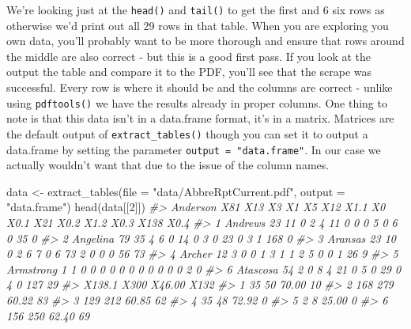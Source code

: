 \documentclass[
  12pt,
]{book}
\newenvironment{Shaded}{\begin{snugshade}}{\end{snugshade}}
\newcommand{\AttributeTok}[1]{\textcolor[rgb]{0.61,0.61,0.61}{#1}}
\newcommand{\CommentTok}[1]{\textcolor[rgb]{0.37,0.37,0.37}{\textit{#1}}}
\newcommand{\DecValTok}[1]{\textcolor[rgb]{0.06,0.06,0.06}{#1}}
\newcommand{\FunctionTok}[1]{\textcolor[rgb]{0,0,0}{#1}}
\newcommand{\NormalTok}[1]{#1}
\newcommand{\OtherTok}[1]{\textcolor[rgb]{0.37,0.37,0.37}{#1}}
\newcommand{\StringTok}[1]{\textcolor[rgb]{0.5,0.5,0.5}{#1}}
\begin{document}
We're looking just at the \texttt{head()} and \texttt{tail()} to get the first and 6 six rows as otherwise we'd print out all 29 rows in that table. When you are exploring you own data, you'll probably want to be more thorough and ensure that rows around the middle are also correct - but this is a good first pass. If you look at the output the table and compare it to the PDF, you'll see that the scrape was successful. Every row is where it should be and the columns are correct - unlike using \texttt{pdftools()} we have the results already in proper columns. One thing to note is that this data isn't in a data.frame format, it's in a matrix. Matrices are the default output of \texttt{extract\_tables()} though you can set it to output a data.frame by setting the parameter \texttt{output\ =\ "data.frame"}. In our case we actually wouldn't want that due to the issue of the column names.

\begin{Shaded}
\begin{Highlighting}[]
\NormalTok{data }\OtherTok{\textless{}{-}} \FunctionTok{extract\_tables}\NormalTok{(}\AttributeTok{file =} \StringTok{"data/AbbreRptCurrent.pdf"}\NormalTok{, }\AttributeTok{output =} \StringTok{"data.frame"}\NormalTok{)}
\FunctionTok{head}\NormalTok{(data[[}\DecValTok{2}\NormalTok{]])}
\CommentTok{\#\textgreater{}    Anderson X81 X13 X3 X1 X5 X12 X1.1 X0 X0.1 X21 X0.2 X1.2 X0.3 X138 X0.4}
\CommentTok{\#\textgreater{} 1   Andrews  23  11  0  2  4  11    0  0    0   5    0    6    0   35    0}
\CommentTok{\#\textgreater{} 2  Angelina  79  35  4  6  0  14    0  3    0  23    0    3    1  168    0}
\CommentTok{\#\textgreater{} 3   Aransas  23  10  0  2  6   7    0  6   73   2    0    0    0   56   73}
\CommentTok{\#\textgreater{} 4    Archer  12   3  0  0  1   3    1  1    2   5    0    0    1   26    9}
\CommentTok{\#\textgreater{} 5 Armstrong   1   1  0  0  0   0    0  0    0   0    0    0    0    2    0}
\CommentTok{\#\textgreater{} 6  Atascosa  54   2  0  8  4  21    0  5    0  29    0    4    0  127   29}
\CommentTok{\#\textgreater{}   X138.1 X300 X46.00 X132}
\CommentTok{\#\textgreater{} 1     35   50  70.00   10}
\CommentTok{\#\textgreater{} 2    168  279  60.22   83}
\CommentTok{\#\textgreater{} 3    129  212  60.85   62}
\CommentTok{\#\textgreater{} 4     35   48  72.92    0}
\CommentTok{\#\textgreater{} 5      2    8  25.00    0}
\CommentTok{\#\textgreater{} 6    156  250  62.40   69}
\end{Highlighting}
\end{Shaded}
\end{document}
